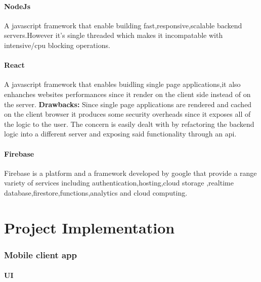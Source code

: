 \documentclass{article}
\begin{document}
\subsection{NodeJs}
A javascript framework that enable building fast,responsive,scalable backend servers.However it's single threaded which makes it incompatable with intensive/cpu blocking operations.
\subsection{React}
A javascript framework that enables buidling single page applications,it also enhanches websites performances since it render on the client side instead of on the server.\linebreak
\textbf{Drawbacks:}
Since single page applications are rendered and cached on the client browser it produces some security overheads since it exposes all of the logic to the user.
The concern is easily dealt with by refactoring the backend logic into a different server and exposing said functionality through an api.
\subsection{Firebase}
Firebase is a platform and a framework developed by google that provide a range variety of services including authentication,hosting,cloud storage ,realtime database,firestore,functions,analytics and cloud computing.


\part{Project Implementation}
\section{Mobile client app}

\subsection{UI}
\end{document}
